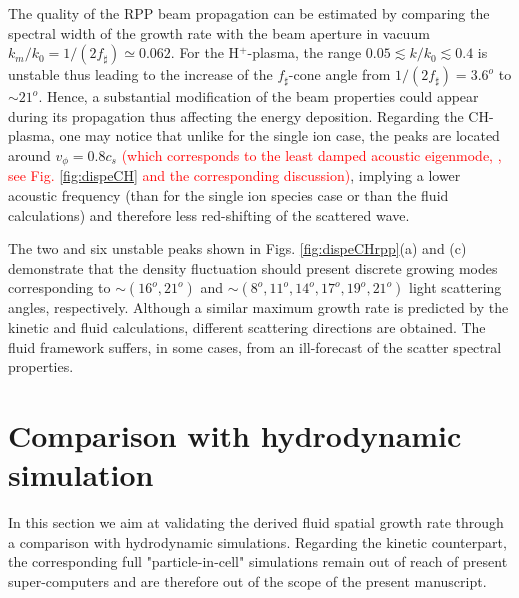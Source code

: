 \documentclass[
 reprint,
 superscriptaddress,
 amsmath,amssymb,
 aps,
]{revtex4-1}
\def\tc{\textcolor{red}}
\begin{document}
The quality of the RPP beam propagation can be estimated by comparing the spectral width of the growth rate  with the  beam aperture in vacuum $k_m/k_0=1/(2f_\sharp) \simeq 0.062$.
For the H$^+$-plasma, 
the range  $0.05 \lesssim k/k_0\lesssim 0.4$ 
is unstable thus  
leading to the increase of the $f_\sharp$-cone 
angle from $1/(2f_\sharp)=3.6^o$ to $\sim 21^o$.
Hence, a substantial modification of the beam 
properties  could appear during its propagation thus affecting the energy deposition.
Regarding the CH-plasma, one may notice that unlike for the single ion case, the peaks are located around $v_\phi=0.8c_s$ \tc{(which corresponds to the least damped acoustic eigenmode, \cite[]{POF_Fried_71,POP_Williams_95}, see Fig. \ref{fig:dispeCH} and the corresponding discussion)}, implying a lower acoustic frequency (than for the single ion species case or than the fluid calculations) and therefore less red-shifting of the scattered wave.

The two and six unstable peaks shown  in  Figs. \ref{fig:dispeCHrpp}(a) and (c) demonstrate that the density fluctuation should present discrete  growing modes corresponding to $\sim (16^o,21^o)$ and $ \sim (8^o,11^o,14^o,17^o,19^o,21^o)$ light scattering angles, respectively.
Although a similar maximum growth rate is predicted by the kinetic and fluid calculations, different scattering directions are obtained. The fluid framework  suffers, in some cases, from an ill-forecast of the scatter spectral properties. 

\section{Comparison with hydrodynamic simulation}
In this section we aim at validating the derived fluid spatial growth rate through a  comparison with hydrodynamic simulations. Regarding the kinetic counterpart, the corresponding full "particle-in-cell" simulations remain out of reach of present super-computers and are therefore out of the scope of the present manuscript. 
\end{document}
